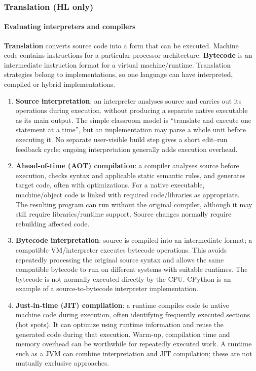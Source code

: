 \documentclass[a4paper,12pt]{article}
\begin{document}
\newpage
\subsubsection{Translation (HL only)}
\paragraph{Evaluating interpreters and compilers}
\textbf{Translation} converts source code into a form that can be executed. Machine code contains instructions for a particular processor architecture. \textbf{Bytecode} is an intermediate instruction format for a virtual machine/runtime. Translation strategies belong to implementations, so one language can have interpreted, compiled or hybrid implementations.
\begin{enumerate}
    \item \textbf{Source interpretation}: an interpreter analyses source and carries out its operations during execution, without producing a separate native executable as its main output. The simple classroom model is ``translate and execute one statement at a time'', but an implementation may parse a whole unit before executing it. No separate user-visible build step gives a short edit--run feedback cycle; ongoing interpretation generally adds execution overhead.
    \item \textbf{Ahead-of-time (AOT) compilation}: a compiler analyses source before execution, checks syntax and applicable static semantic rules, and generates target code, often with optimizations. For a native executable, machine/object code is linked with required code/libraries as appropriate. The resulting program can run without the original compiler, although it may still require libraries/runtime support. Source changes normally require rebuilding affected code.
    \item \textbf{Bytecode interpretation}: source is compiled into an intermediate format; a compatible VM/interpreter executes bytecode operations. This avoids repeatedly processing the original source syntax and allows the same compatible bytecode to run on different systems with suitable runtimes. The bytecode is not normally executed directly by the CPU. CPython is an example of a source-to-bytecode interpreter implementation.
    \item \textbf{Just-in-time (JIT) compilation}: a runtime compiles code to native machine code during execution, often identifying frequently executed sections (hot spots). It can optimize using runtime information and reuse the generated code during that execution. Warm-up, compilation time and memory overhead can be worthwhile for repeatedly executed work. A runtime such as a JVM can combine interpretation and JIT compilation; these are not mutually exclusive approaches.
\end{enumerate}
\end{document}
